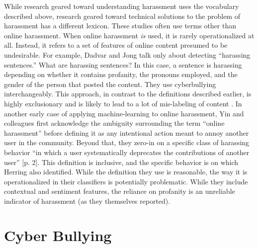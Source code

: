 \documentclass{sigchi}
\begin{document}
While research geared toward understanding harassment uses the vocabulary described above, research geared toward technical solutions to the problem of harassment has a different lexicon.  These studies often use terms other than online harassment.  When online harassment \textit{is} used, it is rarely operationalized at all.  Instead, it refers to a set of features of online content presumed to be undesirable.  For example, Dadvar and Jong \cite{Dadvar2012Cyberbullying} talk only about detecting ``harassing sentences.''  What are harassing sentences?  In this case, a sentence is harassing depending on whether it contains profanity, the pronouns employed, and the gender of the person that posted the content.  They use cyberbullying interchangeably.  This approach, in contrast to the definitions described earlier, is highly exclusionary and is likely to lead to a lot of mis-labeling of content \cite{Guberman2017Challenges}.  In another early case of applying machine-learning to online harassment, Yin and colleagues \cite{yin_detection_2009} first acknowledge the ambiguity surrounding the term ``online harassment'' before defining it as any intentional action meant to annoy another user in the community.  Beyond that, they zero-in on a specific class of harassing behavior ``in which a user systematically deprecates the contributions of another user'' [p. 2].  This definition is inclusive, and the specific behavior is on which Herring \cite{Herring1999Rhetorical} also identified.  While the definition they use is reasonable, the way it is operationalized in their classifiers is potentially problematic.  While they include contextual and sentiment features, the reliance on profanity is an unreliable indicator of harassment (as they themselves reported).  

\section{Cyber Bullying}
\end{document}
